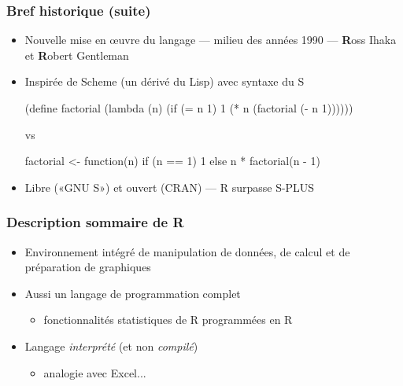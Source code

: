 \begin{frame}[fragile=singleslide]
  \frametitle{Bref historique (suite)}

  \begin{itemize}
  \item Nouvelle mise en {\oe}uvre du langage --- milieu des années
    1990 --- \textbf{R}oss Ihaka et \textbf{R}obert Gentleman
  \item Inspirée de Scheme (un dérivé du Lisp) avec syntaxe du S
\begin{Schunk}
\begin{Sinput}
(define factorial (lambda (n)
  (if (= n 1)
      1
    (* n (factorial (- n 1))))))
\end{Sinput}
\end{Schunk}
vs
\begin{Schunk}
\begin{Sinput}
factorial <- function(n)
  if (n == 1) 1 else n * factorial(n - 1)
\end{Sinput}
\end{Schunk}
  \item Libre («GNU S») et ouvert (CRAN) --- R surpasse S-PLUS
  \end{itemize}
\end{frame}

\begin{frame}
  \frametitle{Description sommaire de R}

  \begin{itemize}
  \item Environnement intégré de manipulation de données, de calcul et
    de préparation de graphiques
  \item Aussi un langage de programmation complet
    \begin{itemize}
    \item fonctionnalités statistiques de R programmées en R
    \end{itemize}
  \item Langage \emph{interprété} (et non \emph{compilé})
    \begin{itemize}
    \item analogie avec Excel...
    \end{itemize}
  \end{itemize}

  \pause
  \begin{center}
    \setlength{\fboxrule}{0.5pt}%
    \href{https://youtu.be/PSQIKSKw_ys}{%
      }
  \end{center}
\end{frame}

